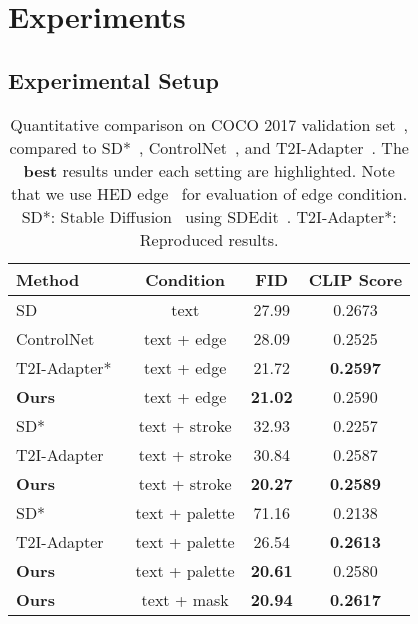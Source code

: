 \documentclass{article}
\begin{document}
\section{Experiments}
\label{section:experiments}

\subsection{Experimental Setup}

\begin{table}[t!]
  \centering
  \caption{Quantitative comparison on COCO 2017 validation set~\cite{lin2014microsoft}, compared to SD*~\cite{rombach2022high}, ControlNet~\cite{zhang2023adding}, and T2I-Adapter~\cite{mou2023t2i}. The \textbf{best} results under each setting are highlighted. Note that we use HED edge~\cite{xie2015holistically} for evaluation of edge condition. SD*: Stable Diffusion~\cite{rombach2022high} using SDEdit~\cite{meng2021sdedit}. T2I-Adapter*: Reproduced results.}
\begin{tabular}{lccc}
   \toprule
   Method & Condition & FID & CLIP Score\\
   \midrule
   SD~\cite{rombach2022high} & text & 27.99 & 0.2673 \\
   \midrule
ControlNet~\cite{zhang2023adding} & text + edge & 28.09 & 0.2525 \\
   T2I-Adapter*~\cite{mou2023t2i} & text + edge & 21.72 & \textbf{0.2597} \\
   \textbf{Ours} & text + edge & \textbf{21.02} & 0.2590 \\
   \midrule
   SD*~\cite{rombach2022high} & text + stroke & 32.93 & 0.2257 \\
   T2I-Adapter~\cite{mou2023t2i} & text + stroke & 30.84 & 0.2587 \\
   \textbf{Ours} & text + stroke & \textbf{20.27} & \textbf{0.2589} \\
   \midrule
   SD*~\cite{rombach2022high} & text + palette & 71.16 & 0.2138 \\
   T2I-Adapter~\cite{mou2023t2i} & text + palette & 26.54 & \textbf{0.2613} \\
   \textbf{Ours} & text + palette & \textbf{20.61} & 0.2580 \\
   \midrule
   \textbf{Ours} & text + mask & \textbf{20.94} & \textbf{0.2617} \\
   \bottomrule
\end{tabular}
\vspace{-1.5em}
\label{table:quantitative comparison}
\end{table}
\end{document}
